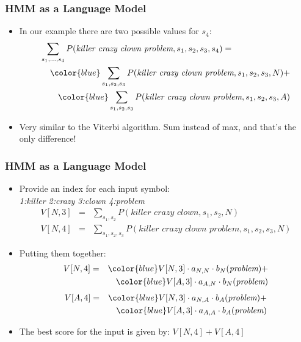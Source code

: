 \begin{frame}
\frametitle{HMM as a Language Model}
\begin{itemize}[<+->]
\item In our example there are two possible values for $s_4$:
\begin{eqnarray*}
\lefteqn{\sum_{s_1, \ldots, s_4} P(\textit{killer crazy clown problem}, s_1, s_2, s_3, s_4) =} \\
&& {\color{blue} \sum_{s_1, s_2, s_3} P(\textit{killer crazy clown problem}, s_1, s_2, s_3, N) } + \\
&&  {\color{blue} \sum_{s_1, s_2, s_3} P(\textit{killer crazy clown problem}, s_1, s_2, s_3, A) }
\end{eqnarray*}
\item Very similar to the Viterbi algorithm. Sum instead of max, and that's the only difference!
\end{itemize}
\end{frame}

\begin{frame}
\frametitle{HMM as a Language Model}
\begin{itemize}[<+->]
\item Provide an index for each input symbol:\\
 {\it 1:killer 2:crazy 3:clown 4:problem} 
\begin{eqnarray*}
V[N, 3] &=& \sum_{s_1, s_2} P(\textit{killer crazy clown}, s_1, s_2, N) \\
V[N, 4] &=& \sum_{s_1, s_2, s_3} P(\textit{killer crazy clown problem}, s_1, s_2, s_3, N)
\end{eqnarray*}

\item Putting them together:
\begin{eqnarray*}
V[N,4] &=& {\color{blue} V[N,3] \cdot a_{N,N} \cdot b_N(\textit{problem}) } +\\
&& {\color{blue} V[A,3] \cdot a_{A,N} \cdot b_N(\textit{problem}) }
\end{eqnarray*}
\begin{eqnarray*}
V[A,4] &=& {\color{blue} V[N,3] \cdot a_{N,A} \cdot b_A(\textit{problem}) } +\\
&& {\color{blue} V[A,3] \cdot a_{A,A} \cdot b_A(\textit{problem}) }
\end{eqnarray*}
\item The best score for the input is given by:
\( V[N,4] + V[A,4] \)
\end{itemize}
\end{frame}

